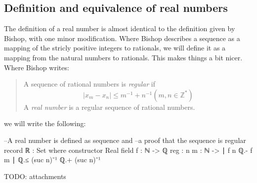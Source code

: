 \documentclass[11pt,a4paper]{article}
\begin{document}
\subsection{Definition and equivalence of real numbers}
The definition of a real number is almost identical to the definition given by Bishop, with one minor modification. Where Bishop describes a sequence as a mapping of the stricly positive integers to rationals, we will define it as a mapping from the natural numbers to rationals. This makes things a bit nicer. Where Bishop writes:
\blockquote{
A sequence of rational numbers is \textit{regular} if 
$$| x_m - x_n | \leq m^{-1} + n^{-1} (m, n \in \mathbb{Z}^*)$$
A \textit{real number} is a regular sequence of rational numbers.
}
we will write the following:
\begin{code}
--A real number is defined as sequence and 
--a proof that the sequence is regular
record ℝ : Set where
  constructor Real
  field
    f : ℕ -> ℚ
    reg : {n m : ℕ} -> ∣ f n ℚ.- f m ∣ ℚ.≤ (suc n)⁻¹ ℚ.+ (suc n)⁻¹

\end{code}
TODO: attachments


\end{document}
